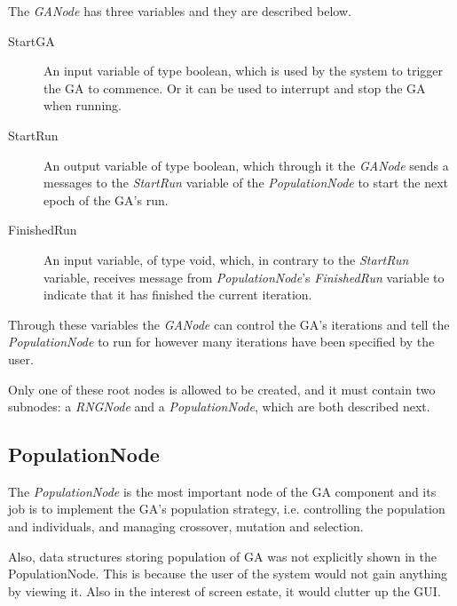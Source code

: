 \documentclass[10pt, notitlepage, a4paper]{article}
\begin{document}
The {\it GANode} has three variables and they are described below.
\begin{description}
\item[StartGA] An input variable of type boolean, which is used by the system to trigger the GA to commence. Or it can be used to interrupt and stop the GA when running.
\item[StartRun] An output variable of type boolean, which through it the {\it GANode} sends a messages to the {\it StartRun} variable of the {\it PopulationNode} to start the next epoch of the GA's run.
\item[FinishedRun] An input variable, of type void, which, in contrary to the {\it StartRun} variable, receives message from {\it PopulationNode}'s {\it FinishedRun} variable to indicate that it has finished the current iteration.
\end{description}
Through these variables the {\it GANode} can control the GA's iterations and tell the {\it PopulationNode} to run for however many iterations have been specified by the user.

Only one of these root nodes is allowed to be created, and it must contain two subnodes: a {\it RNGNode} and a {\it PopulationNode}, which are both described next.

\subsection{PopulationNode}\label{pop_node}
The {\it PopulationNode} is the most important node of the GA component and its job is to implement the GA's population strategy, i.e. controlling the population and individuals, and managing crossover, mutation and selection.

Also, data structures storing population of GA was not explicitly shown in the PopulationNode. This is because the user of the system would not gain anything by viewing it. Also in the interest of screen estate, it would clutter up the GUI.
\end{document}
